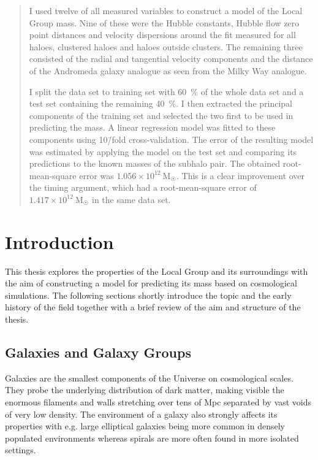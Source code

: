 \documentclass[english, twoside]{HYgradu}
\begin{document}
\begin{abstract}
I used twelve of all measured variables to construct a model of the Local Group mass. Nine of these were the Hubble constants, Hubble flow zero point distances and velocity dispersions around the fit measured for all haloes, clustered haloes and haloes outside clusters. The remaining three consisted of the radial and tangential velocity components and the distance of the Andromeda galaxy analogue as seen from the Milky Way analogue.

I split the data set to training set with 60~\% of the whole data set and a test set containing the remaining 40~\%. I then extracted the principal components of the training set and selected the two first to be used in predicting the mass. A linear regression model was fitted to these components using 10\=/fold cross-validation. The error of the resulting model was estimated by applying the model on the test set and comparing its predictions to the known masses of the subhalo pair. The obtained root-mean-square error was $1.056 \times 10^{12}\ \mathrm{M}_{\astrosun}$. This is a clear improvement over the timing argument, which had a root-mean-square error of $1.417 \times 10^{12}\ \mathrm{M}_{\astrosun}$ in the same data set.
\end{abstract}


\mytableofcontents

\chapter{Introduction}
This thesis explores the properties of the Local Group and its surroundings with the aim of constructing a model for predicting its mass based on cosmological simulations. The following sections shortly introduce the topic and the early history of the field together with a brief review of the aim and structure of the thesis.

\section{Galaxies and Galaxy Groups}
Galaxies are the smallest components of the Universe on cosmological scales. They probe the underlying distribution of dark matter, making visible the enormous filaments and walls stretching over tens of Mpc separated by vast voids of very low density. The environment of a galaxy also strongly affects its properties with e.g. large elliptical galaxies being more common in densely populated environments whereas spirals are more often found in more isolated settings.
\end{document}

